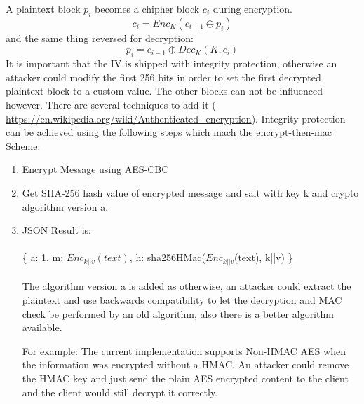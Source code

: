 \documentclass{scrartcl}
\begin{document}
A plaintext block $p_i$ becomes a chipher block $c_i$ during encryption.
$$
c_i = Enc_K(c_{i-1} \oplus p_i)
$$
and the same thing reversed for decryption:
$$
p_i = c_{i-1} \oplus Dec_K(K, c_i)
$$
It is important that the IV is shipped with integrity protection, otherwise an attacker could modify the first 256 bits in order to set the first decrypted plaintext block to a custom value. The other blocks can not be influenced however. 
There are several techniques to add it (
\url{https://en.wikipedia.org/wiki/Authenticated_encryption}).
 Integrity protection can be achieved using the following steps which mach the encrypt-then-mac Scheme:
\begin{enumerate}
\item Encrypt Message using AES-CBC
\item Get SHA-256 hash value of encrypted message and salt with key k and crypto algorithm version a.
\item JSON Result is:\\\\ \{ a: 1, m: $Enc_{k||v}(text)$, h: sha256HMac($Enc_{k||v}$(text), k||v) \}\\\\ The algorithm version a is added as otherwise, an attacker could extract the plaintext and use backwards compatibility to let the decryption and MAC check be performed by an old algorithm, also there is a better algorithm available.

For example: The current implementation supports Non-HMAC AES when the information was encrypted without a HMAC. An attacker could remove the HMAC key and just send the plain AES encrypted content to the client and the client would still decrypt it correctly.

\end{enumerate}
\end{document}
